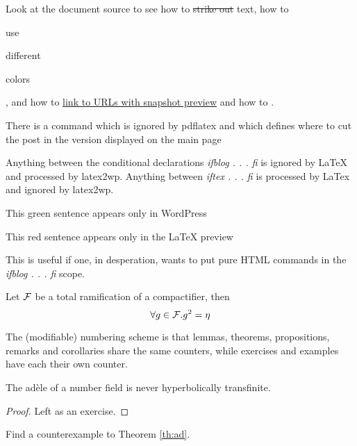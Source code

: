 \documentclass[12pt]{article}
\begin{document}
Look at the document source to see how to \sout{strike out} text, how
to \begin{red}use\end{red} \begin{green}different\end{green} \begin{blue}colors\end{blue},
and how to \href{http://www.google.com}{link to URLs with snapshot preview}
and how to .


There is a command which is ignored by pdflatex and which
defines where to cut the post in the version displayed on the
main page\more

Anything between the conditional declarations {\em ifblog . . . fi}
is ignored by LaTeX and processed by latex2wp. Anything
between {\em iftex . . . fi} is processed by LaTex and ignored
by latex2wp.

\ifblog \begin{green}This green sentence appears only in WordPress \end{green} \fi

\iftex \begin{red}This red sentence appears only in the LaTeX preview \end{red} \fi

This is useful if one, in desperation, wants to put pure HTML commands
in the {\em ifblog . . . fi} scope.


\begin{lemma}[Main] \label{lm:main}
Let $\cal F$ be a total ramification of a compactifier, then
\begin{equation} \label{eq:lemma} \forall g \in {\cal F}. g^2 = \eta \end{equation}
\end{lemma}

The  (modifiable) numbering scheme is that lemmas, theorems,
propositions, remarks and corollaries share the same counters,
while exercises and examples have each their own counter.

\begin{theorem} \label{th:ad} The ad\`ele of a number field is never
hyperbolically transfinite.
\end{theorem}

\begin{proof} Left as an exercise. \end{proof}

\begin{exercise} Find a counterexample to Theorem \ref{th:ad}.
\end{exercise}
\end{document}
